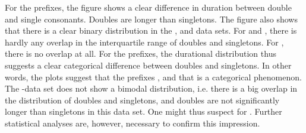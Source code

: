 
For the prefixes, the figure shows a clear difference in duration between double and single consonants. Doubles are longer than singletons. The figure also shows that there is a clear binary distribution in the ,  and data sets.  For  and , there is hardly any overlap in the interquartile range of doubles and singletons. For , there is no overlap at all. For the prefixes, the durational distribution thus suggests a clear categorical difference between doubles and singletons. In other words, the plots suggest that the prefixes , and that  is a categorical phenomenon. 
The -data set does not show a bimodal distribution, i.e. there is a big overlap in the distribution of doubles and singletons, and doubles are not significantly longer than singletons in this data set. One might thus suspect  for . Further statistical analyses are, however, necessary to confirm this impression.











